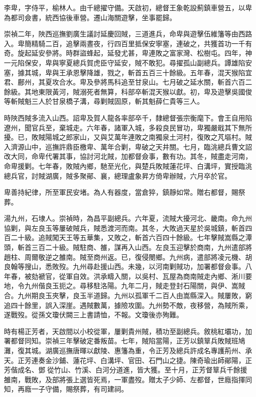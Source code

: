 \begin{pinyinscope}
李卑，字侍平，榆林人。由千總擢守備。天啟初，總督王象乾設薊鎮車營五，以卑為都司僉書，統西協後車營。遷山海關遊擊，坐事罷歸。

崇禎二年，陜西巡撫劉廣生議討延慶回賊，三道進兵，命卑與遊擊伍維籓等由西路入。卑簡精騎二百，追擊兩晝夜，行四百里抵保安寧塞，連破之，共獲首功一千有奇。旋起延安參將。時群盜蜂起，延發尤甚，卑連敗之富家灣、松樹屯。四年，神一元陷保安，卑與寧夏總兵賀虎臣守延安，賊不敢犯。尋擢孤山副總兵。譚雄陷安塞，據其城，卑與王承恩擊降雄，戮之，斬首五百三十餘級。五年春，混天猴陷宜君、鄜州，其夏攻合水。卑及參將馬科追至甘泉山。七月破之延水關，斬首六百二餘級。其地東限黃河，賊溺死者無算，科部卒斬混天猴以獻。初，卑及遊擊吳國俊等斬賊魁三人於甘泉橋子溝，尋剿賊固原，斬其魁薛仁貴等三人。

時陜西賊多流入山西。詔卑及賀人龍各率部卒千，隸總督張宗衡麾下。會王自用陷遼州，聞官兵至，棄城走。六年春，諸軍入城，多殺良民冒功，卑獨嚴戢其下無所擾。已，敗賊陽城之郎家山，又與艾萬年連敗之南獨泉土河村，復敗之芃塸村。賊入濟源山中，巡撫許鼎臣檄卑、萬年合剿，卑破之天井關。七月，臨洮總兵曹文詔改大同，命卑代署其事，協討河北賊，加都督僉事，數有功。其冬，賊盡走河南，命卑援剿。七年春，敗賊內鄉，馳至光化，與楚兵敗賊蓮花坪、白溝坪，實授臨洮總兵官，討賊湖廣，賊多聚鄖、襄，總理盧象昇方倚卑辦賊，六月卒於官。

卑善持紀律，所至軍民安堵。為人有器度，當倉猝，鎮靜如常。贈右都督，賜祭葬。

湯九州，石埭人。崇禎時，為昌平副總兵。六年夏，流賊大擾河北、畿南。命九州協剿，與左良玉等屢破賊兵，賊悉渡河而南。其冬，大敗過天星於吳城鎮，斬首四百二十級。追賊闖天王等五華集，又敗之，斬首六百四十餘級。七年擊賊嵩縣之潭頭，斬首三百二十級。賊駐商、雒，謀再入山西。左良玉迎擊於商南，九州遣部將趙柱、周爾敬逆之雒南。賊至商州返。已，復侵閿鄉。九州病，遣部將凌元機、胡良翰等搜山，悉敗歿。九州尋赴援山西。未幾，以河南剿賊功，加署都督僉事。八年春，被劾褫官，從軍自效。洪承疇入關，以吳村、瓦屋為商南賊走內鄉、淅川要地，令九州偕良玉扼之。尋移駐洛陽。九年二月，賊走登封石陽關，與伊、嵩賊合。九州期良玉夾擊，良玉半道歸。九州以孤軍千二百人由嵩縣深入。賊屢敗，窮追四十餘里，誤入深崖。遇賊數萬，據險攻圍。九州勢不敵，夜移營，為賊所乘，遂戰歿。從孫文瓊伏闕三上書請恤，不報。文瓊後亦殉難。

時有楊正芳者，天啟間以小校從軍，屢剿貴州賊，積功至副總兵。敘桃紅壩功，加署都督同知。崇禎三年擊破定番叛苗。七年，賊陷當陽，正芳以鎮筸兵敗賊班鳩灘，復其城。湖廣巡撫唐暉以獻陵、惠籓為重，令正芳及總兵許成名專護荊州、承天。正芳連奏金沙鋪、蓮花坪、白溝坪、官田、石門山之捷。陳奇瑜出師鄖陽，正芳偕成名、鄧從竹山、竹溪、白河分道進，皆大獲。至十月，正芳督筸兵千餘援雒南，戰敗，及部將張上選皆死焉，一軍盡歿。贈太子少師、左都督，世廕指揮同知，再廕一子守備，賜祭葬，有司建祠。


\end{pinyinscope}

